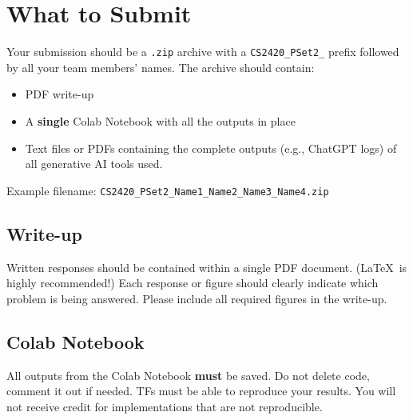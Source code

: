 \documentclass[a4 paper]{article}
\begin{document}
\solution{}


\newpage
\section{What to Submit}
\label{sec:submission}
Your submission should be a \texttt{.zip} archive with a \texttt{CS2420\_PSet2\_} prefix followed by all your team members' names.
The archive should contain:
\begin{itemize}
    \item PDF write-up
    \item A \textbf{single} Colab Notebook with all the outputs in place
    \item Text files or PDFs containing the complete outputs (e.g., ChatGPT logs) of all generative AI tools used.
\end{itemize}



\noindent
Example filename: \texttt{CS2420\_PSet2\_Name1\_Name2\_Name3\_Name4.zip}\\

\subsection*{Write-up}
Written responses should be contained within a single PDF document.
(\LaTeX~is highly recommended!)
Each response or figure should clearly indicate which problem is being answered.
Please include all required figures in the write-up.

\subsection*{Colab Notebook}
All outputs from the Colab Notebook \textbf{must} be saved. Do not delete code, comment it out if needed. TFs must be able to reproduce your results. You will not receive credit for implementations that are not reproducible.
\end{document}
